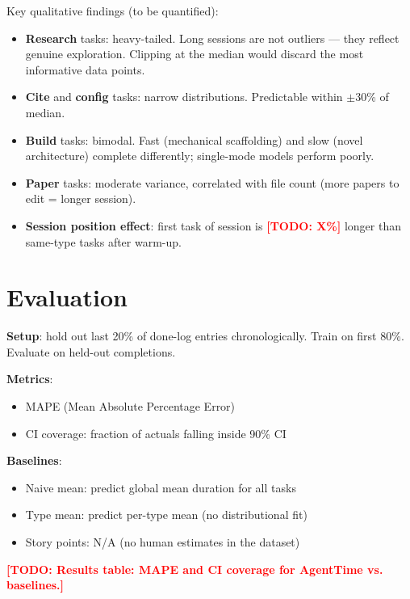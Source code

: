 \documentclass[sigconf]{acmart}
\newcommand{\todo}[1]{\textcolor{red}{\textbf{[TODO: #1]}}}
\begin{document}
Key qualitative findings (to be quantified):
\begin{itemize}[topsep=2pt,itemsep=1pt]
  \item \textbf{Research} tasks: heavy-tailed. Long sessions are not
        outliers — they reflect genuine exploration. Clipping at the median
        would discard the most informative data points.
  \item \textbf{Cite} and \textbf{config} tasks: narrow distributions.
        Predictable within $\pm$30\% of median.
  \item \textbf{Build} tasks: bimodal. Fast (mechanical scaffolding) and
        slow (novel architecture) complete differently; single-mode models
        perform poorly.
  \item \textbf{Paper} tasks: moderate variance, correlated with file count
        (more papers to edit = longer session).
  \item \textbf{Session position effect}: first task of session is
        \todo{X\%} longer than same-type tasks after warm-up.
\end{itemize}

\section{Evaluation}
\label{sec:eval}

\textbf{Setup}: hold out last 20\% of done-log entries chronologically.
Train on first 80\%. Evaluate on held-out completions.

\textbf{Metrics}:
\begin{itemize}[topsep=2pt,itemsep=1pt]
  \item MAPE (Mean Absolute Percentage Error)
  \item CI coverage: fraction of actuals falling inside 90\% CI
\end{itemize}

\textbf{Baselines}:
\begin{itemize}[topsep=2pt,itemsep=1pt]
  \item Naive mean: predict global mean duration for all tasks
  \item Type mean: predict per-type mean (no distributional fit)
  \item Story points: N/A (no human estimates in the dataset)
\end{itemize}

\todo{Results table: MAPE and CI coverage for AgentTime vs. baselines.}
\end{document}
